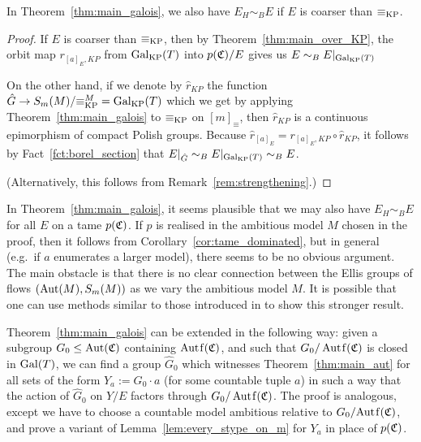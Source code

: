 	\begin{cor}
		In Theorem~\ref{thm:main_galois}, we also have $E_H\sim_B E$ if $E$ is coarser than $\equiv_{\mathrm{KP}}$.
	\end{cor}
	\begin{proof}
		If $E$ is coarser than $\equiv_{\mathrm{KP}}$, then by Theorem~\ref{thm:main_over_KP}, the orbit map $r_{[a]_E,KP}$ from $\operatorname{{Gal}}_{\mathrm{KP}}(T)$ into $p({\mathfrak C})/E$ gives us $E\sim_B E|_{\operatorname{{Gal}}_{\mathrm{KP}}(T)}$
		
		On the other hand, if we denote by $\hat r_{KP}$ the function $\hat G\to S_m(M)/{\equiv_{\mathrm{KP}}^M}=\operatorname{{Gal}}_{\mathrm{KP}}(T)$ which we get by applying Theorem~\ref{thm:main_galois} to $\equiv_{\mathrm{KP}}$ on $[m]_{\equiv}$, then $\hat r_{KP}$ is a continuous epimorphism of compact Polish groups. Because $\hat r_{[a]_E}=r_{[a]_E,KP}\circ \hat r_{KP}$, it follows by Fact~\ref{fct:borel_section} that $E|_{\hat G}\sim_B E|_{\operatorname{{Gal}}_{\mathrm{KP}}(T)}\sim_B E$.
		
		(Alternatively, this follows from Remark~\ref{rem:strengthening}.)
	\end{proof}
	
	\begin{rem}
		In Theorem~\ref{thm:main_galois}, it seems plausible that we may also have $E_H\sim_B E$ for all $E$ on a tame $p({\mathfrak C})$. If $p$ is realised in the ambitious model $M$ chosen in the proof, then it follows from Corollary~\ref{cor:tame_dominated}, but in general (e.g.\ if $a$ enumerates a larger model), there seems to be no obvious argument. The main obstacle is that there is no clear connection between the Ellis groups of flows $(\operatorname{{Aut}}(M),S_m(M))$ as we vary the ambitious model $M$. It is possible that one can use methods similar to those introduced in \cite{KNS17} to show this stronger result.\xqed{\lozenge}
	\end{rem}
	
	\begin{rem}
		Theorem~\ref{thm:main_galois} can be extended in the following way: given a subgroup $G_0\leq \operatorname{{Aut}}({\mathfrak C})$ containing $\Autf(\fC)$, and such that $G_0/\Autf(\fC)$ is closed in $\operatorname{{Gal}}(T)$, we can find a group $\hat G_0$ which witnesses Theorem~\ref{thm:main_aut} for all sets of the form $Y_a:=G_0\cdot a$ (for some countable tuple $a$) in such a way that the action of $\hat G_0$ on $Y/E$ factors through $G_0/\Autf(\fC)$. The proof is analogous, except we have to choose a countable model ambitious relative to $G_0/{\Autf(\fC)}$, and prove a variant of Lemma~\ref{lem:every_stype_on_m} for $Y_a$ in place of $p({\mathfrak C})$.
	\end{rem}
	
